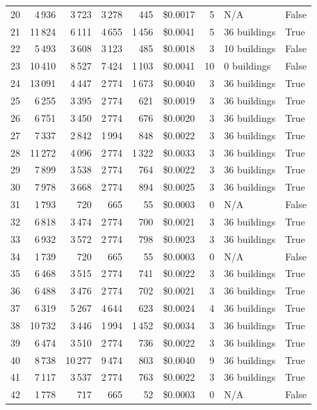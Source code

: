 \documentclass[a4paper,11pt]{article}
\begin{document}
\begin{table}[ht]
\begin{tabular}{r r r r r r r p{3cm} l}
20 & 4\,936 & 3\,723 & 3\,278 & 445 & \$0.0017 & 5 & N/A & False \\
21 & 11\,824 & 6\,111 & 4\,655 & 1\,456 & \$0.0041 & 5 & 36 buildings & True \\
22 & 5\,493 & 3\,608 & 3\,123 & 485 & \$0.0018 & 3 & 10 buildings & False \\
23 & 10\,410 & 8\,527 & 7\,424 & 1\,103 & \$0.0041 & 10 & 0 buildings & False \\
24 & 13\,091 & 4\,447 & 2\,774 & 1\,673 & \$0.0040 & 3 & 36 buildings & True \\
25 & 6\,255 & 3\,395 & 2\,774 & 621 & \$0.0019 & 3 & 36 buildings & True \\
26 & 6\,751 & 3\,450 & 2\,774 & 676 & \$0.0020 & 3 & 36 buildings & True \\
27 & 7\,337 & 2\,842 & 1\,994 & 848 & \$0.0022 & 3 & 36 buildings & True \\
28 & 11\,272 & 4\,096 & 2\,774 & 1\,322 & \$0.0033 & 3 & 36 buildings & True \\
29 & 7\,899 & 3\,538 & 2\,774 & 764 & \$0.0022 & 3 & 36 buildings & True \\
30 & 7\,978 & 3\,668 & 2\,774 & 894 & \$0.0025 & 3 & 36 buildings & True \\
31 & 1\,793 & 720 & 665 & 55 & \$0.0003 & 0 & N/A & False \\
32 & 6\,818 & 3\,474 & 2\,774 & 700 & \$0.0021 & 3 & 36 buildings & True \\
33 & 6\,932 & 3\,572 & 2\,774 & 798 & \$0.0023 & 3 & 36 buildings & True \\
34 & 1\,739 & 720 & 665 & 55 & \$0.0003 & 0 & N/A & False \\
35 & 6\,468 & 3\,515 & 2\,774 & 741 & \$0.0022 & 3 & 36 buildings & True \\
36 & 6\,488 & 3\,476 & 2\,774 & 702 & \$0.0021 & 3 & 36 buildings & True \\
37 & 6\,319 & 5\,267 & 4\,644 & 623 & \$0.0024 & 4 & 36 buildings & True \\
38 & 10\,732 & 3\,446 & 1\,994 & 1\,452 & \$0.0034 & 3 & 36 buildings & True \\
39 & 6\,474 & 3\,510 & 2\,774 & 736 & \$0.0022 & 3 & 36 buildings & True \\
40 & 8\,738 & 10\,277 & 9\,474 & 803 & \$0.0040 & 9 & 36 buildings & True \\
41 & 7\,117 & 3\,537 & 2\,774 & 763 & \$0.0022 & 3 & 36 buildings & True \\
42 & 1\,778 & 717 & 665 & 52 & \$0.0003 & 0 & N/A & False \\

\end{tabular}
\end{table}
\end{document}

